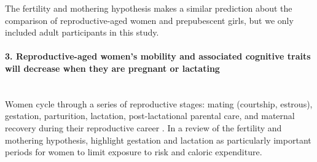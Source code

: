 

The fertility and mothering hypothesis makes a similar prediction about the comparison of reproductive-aged women and prepubescent girls, but we only included adult participants in this study.
  
\paragraph{3.  Reproductive-aged women's mobility and associated cognitive traits will decrease when they are pregnant or lactating}\mbox{}\\

Women cycle through a series of reproductive stages: mating (courtship, estrous), gestation, parturition, lactation, post-lactational parental care, and maternal recovery during their reproductive career \citep{gittleman1988energy}.  In a review of the fertility and mothering hypothesis, \citet{jones2003evolution} highlight gestation and lactation as particularly important periods for women to limit exposure to risk and caloric expenditure.  


